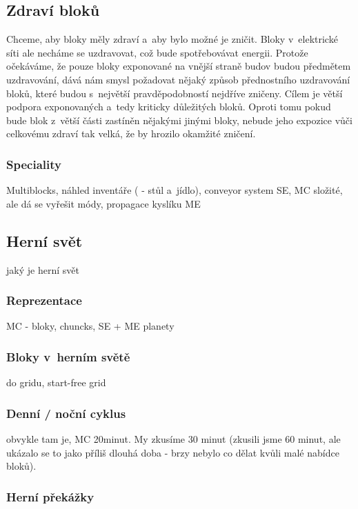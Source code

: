 \subsection{Zdraví bloků}
Chceme, aby bloky měly zdraví a~aby bylo možné je zničit. Bloky v~elektrické síti ale necháme se uzdravovat, což bude spotřebovávat energii. Protože očekáváme, že pouze bloky exponované na vnější straně budov budou předmětem uzdravování, dává nám smysl požadovat nějaký způsob přednostního uzdravování bloků, které budou s~největší pravděpodobností nejdříve zničeny. Cílem je větší podpora exponovaných a~tedy kriticky důležitých bloků. Oproti tomu pokud bude blok z~větší části zastíněn nějakými jinými bloky, nebude jeho expozice vůči celkovému zdraví tak velká, že by hrozilo okamžité zničení.

\subsubsection{Speciality}
Multiblocks, náhled inventáře (\ME{} - stůl a~jídlo), conveyor system SE, MC složité, ale dá se vyřešit módy, propagace kyslíku ME

\subsection{Herní svět}

jaký je herní svět

\subsubsection{Reprezentace}

MC - bloky, chuncks, SE + ME planety

\subsubsection{Bloky v~herním světě}

do gridu, start-free grid


\subsubsection{Denní / noční cyklus}

obvykle tam je, MC 20minut. My zkusíme 30 minut (zkusili jsme 60 minut, ale ukázalo se to jako příliš dlouhá doba - brzy nebylo co dělat kvůli malé nabídce bloků).

\subsubsection{Herní překážky}

